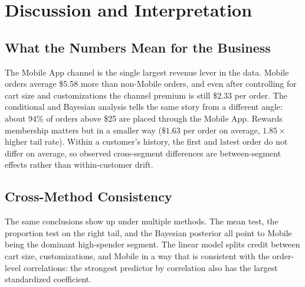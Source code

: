 \documentclass[conference,10pt]{IEEEtran}
\begin{document}
\section{Discussion and Interpretation}

\subsection{What the Numbers Mean for the Business}
The Mobile App channel is the single largest revenue lever in the data. Mobile orders average \$5.58 more than non\nobreakdash-Mobile orders, and even after controlling for cart size and customizations the channel premium is still \$2.33 per order. The conditional and Bayesian analysis tells the same story from a different angle: about 94\% of orders above \$25 are placed through the Mobile App. Rewards membership matters but in a smaller way ($\$1.63$ per order on average, $1.85{\times}$ higher tail rate). Within a customer's history, the first and latest order do not differ on average, so observed cross\nobreakdash-segment differences are between\nobreakdash-segment effects rather than within\nobreakdash-customer drift.

\subsection{Cross-Method Consistency}
The same conclusions show up under multiple methods. The mean test, the proportion test on the right tail, and the Bayesian posterior all point to Mobile being the dominant high\nobreakdash-spender segment. The linear model splits credit between cart size, customizations, and Mobile in a way that is consistent with the order\nobreakdash-level correlations: the strongest predictor by correlation also has the largest standardized coefficient.
\end{document}
